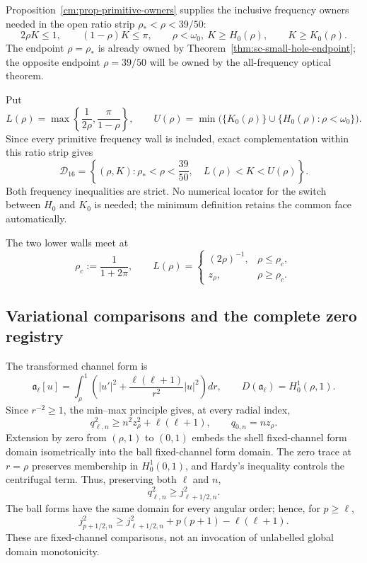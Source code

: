 \documentclass[11pt]{article}
\numberwithin{equation}{section}
\theoremstyle{definition}
\theoremstyle{remark}
\begin{document}
Proposition~\ref{cm:prop-primitive-owners} supplies the inclusive
frequency owners needed in the open ratio strip
\(\rho_*<\rho<39/50\):
\[
 2\rho K\leq1,\qquad (1-\rho)K\leq\pi,\qquad
 \rho<\omega_0,\ K\geq H_0(\rho),\qquad K\geq K_0(\rho).
\]
The endpoint \(\rho=\rho_*\) is already owned by
Theorem~\ref{thm:sc-small-hole-endpoint}; the opposite endpoint
\(\rho=39/50\) will be owned by the all-frequency optical theorem.

Put
\[
 L(\rho)=\max\left\{\frac1{2\rho},\frac\pi{1-\rho}\right\},
 \qquad
 U(\rho)=
 \min\bigl(\{K_0(\rho)\}\cup
 \{H_0(\rho):\rho<\omega_0\}\bigr).
\]
Since every primitive frequency wall is included, exact complementation
within this ratio strip gives
\begin{equation}
 \mathcal D_{16}=
 \left\{(\rho,K):\rho_*<\rho<\frac{39}{50},\quad
 L(\rho)<K<U(\rho)\right\}.
 \label{cm:eq-D16}
\end{equation}
Both frequency inequalities are strict.  No numerical locator for the
switch between \(H_0\) and \(K_0\) is needed; the minimum definition retains
the common face automatically.

The two lower walls meet at
\[
 \rho_c:=\frac1{1+2\pi},\qquad
 L(\rho)=
 \begin{cases}
  (2\rho)^{-1},&\rho\leq\rho_c,\\
  z_\rho,&\rho\geq\rho_c.
 \end{cases}
\]

\subsection{Variational comparisons and the complete zero registry}

The transformed channel form is
\[
 \mathfrak a_\ell[u]=\int_\rho^1
 \left(|u'|^2+\frac{\ell(\ell+1)}{r^2}|u|^2\right)dr,
 \qquad D(\mathfrak a_\ell)=H_0^1(\rho,1).
\]
Since \(r^{-2}\geq1\), the min--max principle gives, at every radial
index,
\begin{equation}
 q_{\ell,n}^2\geq n^2z_\rho^2+\ell(\ell+1),
 \qquad q_{0,n}=nz_\rho.
 \label{cm:eq-product-bound}
\end{equation}
Extension by zero from \((\rho,1)\) to \((0,1)\) embeds the shell
fixed-channel form domain isometrically into the ball fixed-channel form
domain.  The zero trace at \(r=\rho\) preserves membership in
\(H_0^1(0,1)\), and Hardy's inequality controls the centrifugal term.
Thus, preserving both \(\ell\) and \(n\),
\begin{equation}
 q_{\ell,n}^2\geq j_{\ell+1/2,n}^2.
 \label{cm:eq-shell-ball}
\end{equation}
The ball forms have the same domain for every angular order; hence, for
\(p\geq\ell\),
\begin{equation}
 j_{p+1/2,n}^2\geq j_{\ell+1/2,n}^2
 +p(p+1)-\ell(\ell+1).
 \label{cm:eq-angular-propagation}
\end{equation}
These are fixed-channel comparisons, not an invocation of unlabelled
global domain monotonicity.
\end{document}
